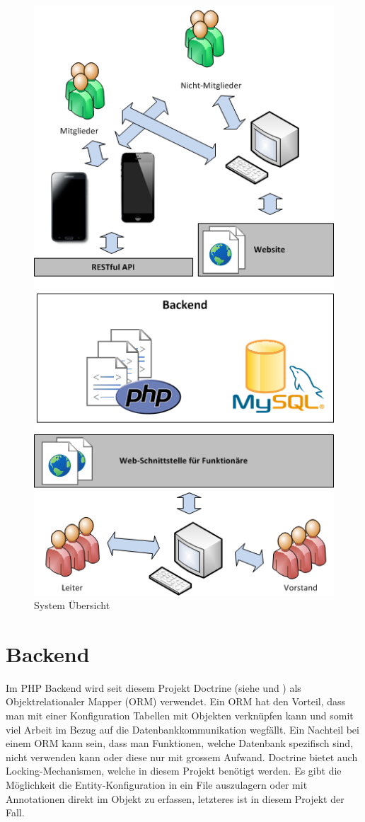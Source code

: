 \begin{figure}[h]
\centering
\includegraphics[scale=0.5]{images/visio/SystemScope.png}
\caption{System Übersicht}
\label{fig:system_scope}
\end{figure}

\section{Backend}\label{arch_backend}
Im PHP Backend wird seit diesem Projekt Doctrine (siehe \cite{doctrine} und \cite{dunglas2013persistence}) als Objektrelationaler Mapper (ORM) verwendet. Ein ORM hat den Vorteil, dass man mit einer Konfiguration Tabellen mit Objekten verknüpfen kann und somit viel Arbeit im Bezug auf die Datenbankkommunikation wegfällt. Ein Nachteil bei einem ORM kann sein, dass man Funktionen, welche Datenbank spezifisch sind, nicht verwenden kann oder diese nur mit grossem Aufwand. Doctrine bietet auch Locking-Mechanismen, welche in diesem Projekt benötigt werden. Es gibt die Möglichkeit die Entity-Konfiguration in ein File auszulagern oder mit Annotationen direkt im Objekt zu erfassen, letzteres ist in diesem Projekt der Fall. 

